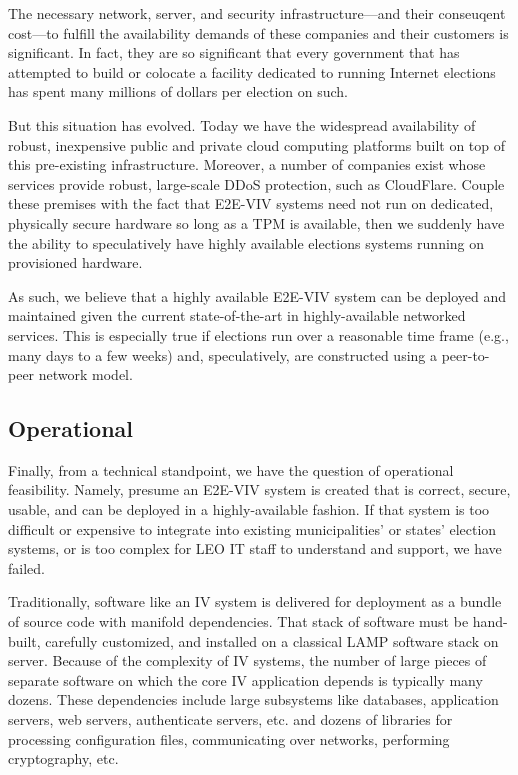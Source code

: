 The necessary network, server, and security infrastructure---and their
conseuqent cost---to fulfill the availability demands of these
companies and their customers is significant. In fact, they are so
significant that every government that has attempted to build or
colocate a facility dedicated to running Internet elections has spent
many millions of dollars per election on such.

But this situation has evolved. Today we have the widespread
availability of robust, inexpensive public and private cloud computing
platforms built on top of this pre-existing infrastructure. Moreover,
a number of companies exist whose services provide robust, large-scale
DDoS protection, such as CloudFlare. Couple these premises with the
fact that E2E-VIV systems need not run on dedicated, physically secure
hardware so long as a TPM is available, then we suddenly have the
ability to speculatively have highly available elections systems
running on provisioned hardware. 

As such, we believe that a highly available E2E-VIV system can be
deployed and maintained given the current state-of-the-art in
highly-available networked services. This is especially true if
elections run over a reasonable time frame (e.g., many days to a few
weeks) and, speculatively, are constructed using a peer-to-peer
network model.

\subsection{Operational}
\label{sec:operational}

Finally, from a technical standpoint, we have the question of
operational feasibility.  Namely, presume an E2E-VIV system is created
that is correct, secure, usable, and can be deployed in a
highly-available fashion. If that system is too difficult or expensive
to integrate into existing municipalities' or states' election
systems, or is too complex for LEO IT staff to understand and support,
we have failed.

Traditionally, software like an IV system is delivered for deployment
as a bundle of source code with manifold dependencies. That stack of
software must be hand-built, carefully customized, and installed on a
classical LAMP software stack on server.  Because of the complexity of
IV systems, the number of large pieces of separate software on which
the core IV application depends is typically many dozens.  These
dependencies include large subsystems like databases, application
servers, web servers, authenticate servers, etc. and dozens of
libraries for processing configuration files, communicating over
networks, performing cryptography, etc.

